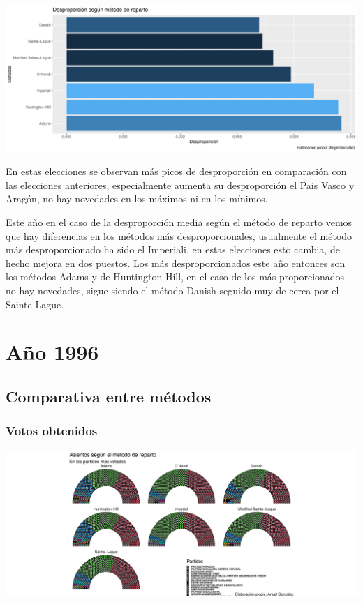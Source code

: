 \documentclass[12pt,a4paper,]{book}
\numberwithin{dummy}{section}
\theoremstyle{ocrenumbox}
\theoremstyle{blacknumex}
\theoremstyle{blacknumbox}
\theoremstyle{ocrenum}
\theoremstyle{ocrenum}
\begin{document}
\begin{center}\includegraphics[width=0.95\linewidth]{figurasR/unnamed-chunk-108-2} \end{center}

En estas elecciones se observan más picos de desproporción en
comparación con las elecciones anteriores, especialmente aumenta su
desproporción el Pais Vasco y Aragón, no hay novedades en los máximos ni
en los mínimos.

Este año en el caso de la desproporción media según el método de reparto
vemos que hay diferencias en los métodos más desproporcionales,
usualmente el método más desproporcionado ha sido el Imperiali, en estas
elecciones esto cambia, de hecho mejora en dos puestos. Los más
desproporcionados este año entonces son los métodos Adams y de
Huntington-Hill, en el caso de los más proporcionados no hay novedades,
sigue siendo el método Danish seguido muy de cerca por el Sainte-Lague.

\hypertarget{auxf1o-1996}{%
\section{Año 1996}\label{auxf1o-1996}}

\hypertarget{comparativa-entre-muxe9todos-6}{%
\subsection{Comparativa entre
métodos}\label{comparativa-entre-muxe9todos-6}}

\hypertarget{votos-obtenidos-6}{%
\subsubsection{Votos obtenidos}\label{votos-obtenidos-6}}

\begin{center}\includegraphics[width=0.95\linewidth]{figurasR/unnamed-chunk-116-1} \end{center}
\end{document}
